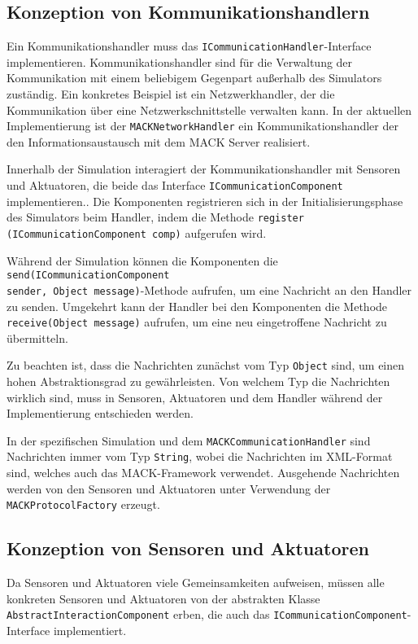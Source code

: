 \subsection{Konzeption von Kommunikationshandlern}\label{subsec:concept_communication}
Ein Kommunikationshandler muss das \texttt{ICommunicationHandler}-Interface implementieren. Kommunikationshandler sind für die Verwaltung der Kommunikation mit einem beliebigem Gegenpart außerhalb des Simulators zuständig. Ein konkretes Beispiel ist ein Netzwerkhandler, der die Kommunikation über eine Netzwerkschnittstelle verwalten kann. In der aktuellen Implementierung ist der \texttt{MACKNetworkHandler} ein Kommunikationshandler der den Informationsaustausch mit dem MACK Server realisiert.

Innerhalb der Simulation interagiert der Kommunikationshandler mit Sensoren und Aktuatoren, die beide das Interface \texttt{ICommunicationComponent} implementieren.. Die Komponenten registrieren sich in der Initialisierungsphase des Simulators beim Handler, indem die Methode \texttt{re\-gister (ICommunication\-Component comp)} aufgerufen wird.

Während der Simulation können die Komponenten die \texttt{send(ICommunication\-Component\\
sender, Object message)}-Methode aufrufen, um eine Nachricht an den Handler zu senden. Umgekehrt kann der Handler bei den Komponenten die Methode \texttt{receive(Object message)} aufrufen, um eine neu eingetroffene Nachricht zu übermitteln.

Zu beachten ist, dass die Nachrichten zunächst vom Typ \texttt{Object} sind, um einen hohen Abstraktionsgrad zu gewährleisten. Von welchem Typ die Nachrichten wirklich sind, muss in Sensoren, Aktuatoren und dem Handler während der Implementierung entschieden werden.

In der spezifischen Simulation und dem \texttt{MACKCommunicationHandler} sind Nachrichten immer vom Typ \texttt{String}, wobei die Nachrichten im XML-Format sind, welches auch das MACK-Framework verwendet. Ausgehende Nachrichten werden von den Sensoren und Aktuatoren unter Verwendung der \texttt{MACKProtocolFactory} erzeugt.


\subsection{Konzeption von Sensoren und Aktuatoren}\label{subsec:concept_actuators_sensors}
Da Sensoren und Aktuatoren viele Gemeinsamkeiten aufweisen, müssen alle konkreten Sensoren und Aktuatoren von der abstrakten Klasse \texttt{AbstractInteractionComponent} erben, die auch das \texttt{ICommunication\-Component}-Interface implementiert.

